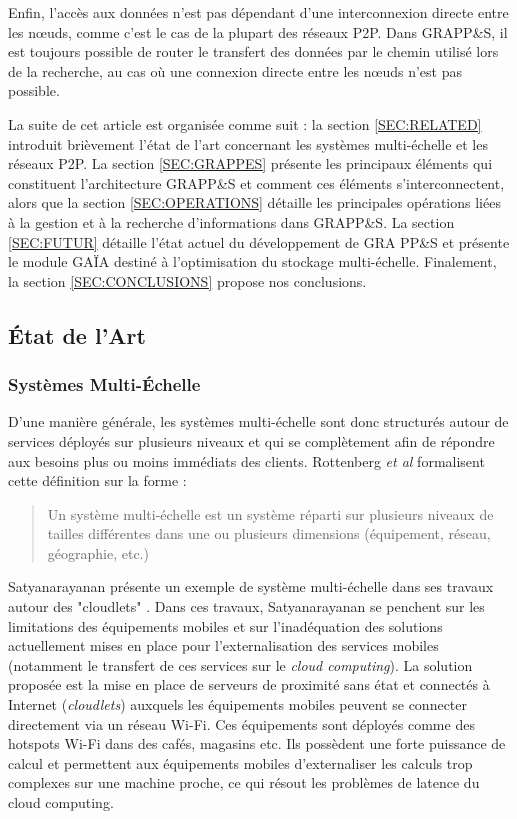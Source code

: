Enfin, l'accès aux données n'est pas dépendant d'une interconnexion directe entre les n{\oe}uds, comme c'est le cas de la plupart des réseaux P2P. Dans GRAPP\&S, il est toujours possible de router le transfert des données par le chemin utilisé lors de la recherche, au cas où une connexion directe entre les n{\oe}uds n'est pas possible.

La suite de cet article est organisée comme suit : la section \ref{SEC:RELATED} introduit brièvement l'état de l'art concernant les systèmes multi-échelle et les réseaux P2P. La section \ref{SEC:GRAPPES} présente les principaux éléments qui constituent l'architecture GRAPP\&S et comment ces éléments s'interconnectent, alors que la section \ref{SEC:OPERATIONS} détaille les principales opérations liées à la gestion et à la recherche d'informations dans GRAPP\&S. La section \ref{SEC:FUTUR} détaille l'état actuel du développement de GRA PP\&S et présente le module \textsf{GAÏA} destiné à l'optimisation du stockage multi-échelle. Finalement, la section \ref{SEC:CONCLUSIONS} propose nos conclusions.

\subsection{État de l'Art\label{SEC:RELATED}}
\subsubsection*{Systèmes Multi-Échelle\label{SEC:MULTISCALE}}

D'une manière générale, les systèmes multi-échelle sont donc structurés autour de services déployés sur plusieurs niveaux et qui se complètement afin de répondre aux besoins plus ou moins immédiats des clients. Rottenberg \textit{et al} \cite{Rottenberg2012} formalisent cette définition sur la forme :
\begin{quote}
	Un système multi-échelle est un système réparti sur plusieurs niveaux de tailles différentes dans une ou plusieurs dimensions (équipement, réseau, géographie, etc.)
\end{quote}

Satyanarayanan présente un exemple de système multi-échelle dans ses travaux autour des "cloudlets" \cite{Satyanarayanan11,Satyanarayanan09}. Dans ces travaux, Satyanarayanan se penchent sur les limitations des équipements mobiles et sur l'inadéquation des solutions actuellement mises en place pour l'externalisation des services mobiles (notamment le transfert de ces services sur le \textit{cloud computing}). La solution proposée est la mise en place de serveurs de proximité sans état et connectés à Internet (\textit{cloudlets}) auxquels les équipements mobiles peuvent se connecter directement via un réseau Wi-Fi. Ces équipements sont déployés comme des hotspots Wi-Fi dans des cafés, magasins etc. Ils possèdent une forte puissance de calcul et permettent aux équipements mobiles d'externaliser les calculs trop complexes sur une machine proche, ce qui résout les problèmes de latence du cloud computing.

